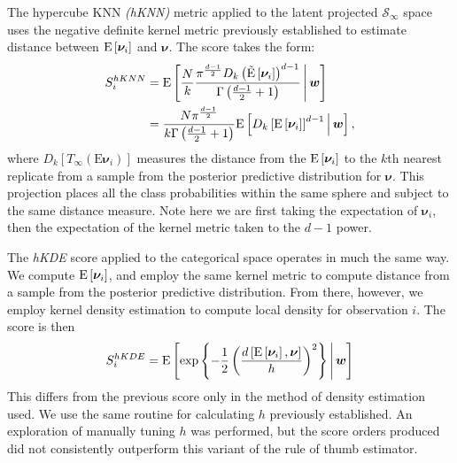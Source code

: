 The hypercube KNN \emph{(hKNN)} metric applied to the latent projected 
    $\mathcal{S}_{\infty}$ space uses the negative definite kernel metric 
    previously established to estimate distance between $\text{E}\left[\bm{\nu}_i\right]$ 
    and $\bm{\nu}$.  The score takes the form:
    \begin{equation}
      \label{score:cat_hknn}
      \begin{aligned}
      S_i^{hKNN} &= \text{E}\left[\frac{N}{k}
        \frac{\pi^{\frac{d-1}{2}}D_{k}
        \left(\tilde{\text{E}}\left[\bm{\nu}_i\right]\right)^{d-1}}{
          \Gamma\left(\frac{d-1}{2} + 1\right)}
      \,\middle\vert\,\bm{w}\right]\\
      &= \frac{N\pi^{\frac{d-1}{2}}}{k\Gamma\left(\frac{d-1}{2} + 1\right)}
      \text{E}\left[D_{k}\left[\text{E}\left[\bm{\nu}_i\right]\right]^{d-1}\,\middle\vert\,\bm{w}\right],
      \end{aligned}
    \end{equation}
    where $D_{k}\left[T_{\infty}(\text{E}\bm{\nu}_i)\right]$ measures the 
    distance from the  $\text{E}\left[\bm{\nu}_i\right]$ to the $k$th nearest replicate from 
    a sample from the posterior predictive distribution for $\bm{\nu}$.  This 
    projection places all the class probabilities within the same sphere and 
    subject to the same distance measure.  Note here we are first taking the 
    expectation of $\bm{\nu}_i$, then the expectation of the kernel metric taken 
    to the $d-1$ power.

The \emph{hKDE} score applied to the categorical space operates in much the 
  same way.  We compute $\text{E}\left[\bm{\nu}_i\right]$, and employ the same kernel metric
  to compute distance from a sample from the posterior predictive distribution. 
  From there, however, we employ kernel density estimation 
  to compute local density for observation $i$.  The score is then
\begin{equation}
    \label{score:cat_hkde}
    S_i^{hKDE} = \text{E}\left[
    \exp\left\lbrace
    -\frac{1}{2}\left(
    \frac{
    d\left[\text{E}\left[\bm{\nu}_i\right], \bm{\nu}\right]}{h}
    \right)^2
    \right\rbrace 
    \,\middle\vert\, \bm{w}\right]
\end{equation}
This differs from the previous score only in the method of density estimation 
  used.  We use the same routine for calculating $h$ previously established.  An 
  exploration of manually tuning $h$ was performed, but the score orders 
  produced did not consistently outperform this variant of the rule of thumb 
  estimator.

